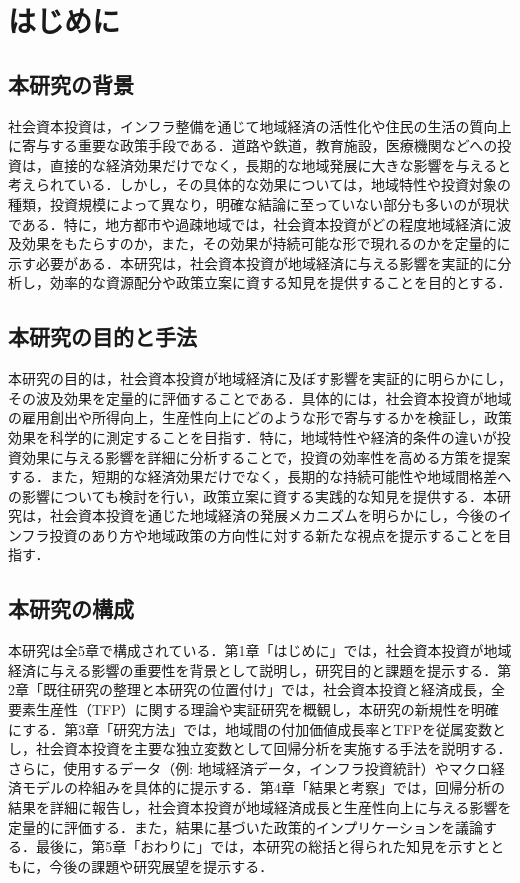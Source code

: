 \chapter{はじめに}

\section{本研究の背景}

社会資本投資は，インフラ整備を通じて地域経済の活性化や住民の生活の質向上に寄与する重要な政策手段である．道路や鉄道，教育施設，医療機関などへの投資は，直接的な経済効果だけでなく，長期的な地域発展に大きな影響を与えると考えられている．しかし，その具体的な効果については，地域特性や投資対象の種類，投資規模によって異なり，明確な結論に至っていない部分も多いのが現状である．特に，地方都市や過疎地域では，社会資本投資がどの程度地域経済に波及効果をもたらすのか，また，その効果が持続可能な形で現れるのかを定量的に示す必要がある．本研究は，社会資本投資が地域経済に与える影響を実証的に分析し，効率的な資源配分や政策立案に資する知見を提供することを目的とする．


\section{本研究の目的と手法}

本研究の目的は，社会資本投資が地域経済に及ぼす影響を実証的に明らかにし，その波及効果を定量的に評価することである．具体的には，社会資本投資が地域の雇用創出や所得向上，生産性向上にどのような形で寄与するかを検証し，政策効果を科学的に測定することを目指す．特に，地域特性や経済的条件の違いが投資効果に与える影響を詳細に分析することで，投資の効率性を高める方策を提案する．また，短期的な経済効果だけでなく，長期的な持続可能性や地域間格差への影響についても検討を行い，政策立案に資する実践的な知見を提供する．本研究は，社会資本投資を通じた地域経済の発展メカニズムを明らかにし，今後のインフラ投資のあり方や地域政策の方向性に対する新たな視点を提示することを目指す．

\section{本研究の構成}

本研究は全5章で構成されている．第1章「はじめに」では，社会資本投資が地域経済に与える影響の重要性を背景として説明し，研究目的と課題を提示する．第2章「既往研究の整理と本研究の位置付け」では，社会資本投資と経済成長，全要素生産性（TFP）に関する理論や実証研究を概観し，本研究の新規性を明確にする．第3章「研究方法」では，地域間の付加価値成長率とTFPを従属変数とし，社会資本投資を主要な独立変数として回帰分析を実施する手法を説明する．さらに，使用するデータ（例: 地域経済データ，インフラ投資統計）やマクロ経済モデルの枠組みを具体的に提示する．第4章「結果と考察」では，回帰分析の結果を詳細に報告し，社会資本投資が地域経済成長と生産性向上に与える影響を定量的に評価する．また，結果に基づいた政策的インプリケーションを議論する．最後に，第5章「おわりに」では，本研究の総括と得られた知見を示すとともに，今後の課題や研究展望を提示する．

